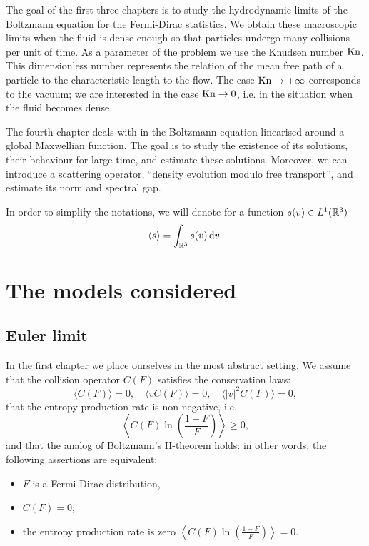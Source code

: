 The goal of the first three chapters is to study the hydrodynamic limits of the Boltzmann equation for the Fermi-Dirac statistics. We obtain these macroscopic limits when the fluid is dense enough so that particles undergo many collisions per unit of time. As a parameter of the problem we use the Knudsen number $\operatorname{Kn}$. This dimensionless number represents the relation of the mean free path of a particle to the characteristic length to the flow. The case $\operatorname{Kn}\to +\infty$ corresponds to the vacuum; we are interested in the case $\operatorname{Kn}\to 0$, i.e. in the situation when the fluid becomes dense.

The fourth chapter deals with in the Boltzmann equation linearised around a global Maxwellian function. The goal is to study the existence of its solutions, their behaviour for large time, and estimate these solutions. Moreover, we can introduce a scattering operator, \enquote{density evolution modulo free transport}, and  estimate its norm and spectral gap. 


In order to simplify the notations, we will denote for a function $s(v)\in L^1 ({\mathbb R^3})$
\[\langle s\rangle = \int_{{\mathbb R^3}} s(v){\,\mathrm{d} v}.\]



\section{The models considered} %
\label{sec:studied_models}

\subsection{Euler limit} %
\label{sub:euler_limit}

In the first chapter we place ourselves in the most abstract setting. We assume that the collision operator $C(F)$ satisfies the conservation laws:
\[\langle C(F)\rangle=0, \quad \langle vC(F)\rangle=0, \quad \langle |v|^2C(F)\rangle=0,\]
 that the entropy production rate is non-negative, i.e.
\[\left \langle C(F)\ln \left(\frac{1-F}{F}\right)\right\rangle\ge0,\]
and that the analog of Boltzmann's H-theorem holds:
in other words, the following assertions are equivalent:
\begin{itemize}
	\item $F$ is a Fermi-Dirac distribution,
	\item $C(F)=0$,
	\item the entropy production rate is zero $\left \langle C(F)\ln \left(\frac{1-F}{F}\right)\right\rangle=0$.
\end{itemize}

